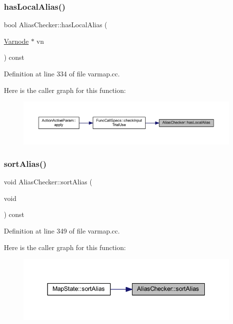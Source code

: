\subsubsection{\texorpdfstring{hasLocalAlias()}{hasLocalAlias()}}
{\footnotesize\ttfamily bool Alias\+Checker\+::has\+Local\+Alias (\begin{DoxyParamCaption}\item[{\mbox{\hyperlink{class_varnode}{Varnode}} $\ast$}]{vn }\end{DoxyParamCaption}) const}



Definition at line 334 of file varmap.\+cc.

Here is the caller graph for this function\+:
\nopagebreak
\begin{figure}[H]
\begin{center}
\leavevmode
\includegraphics[width=350pt]{class_alias_checker_a2bcaccaa3b0553741c68abf06115e113_icgraph}
\end{center}
\end{figure}
\mbox{\label{class_alias_checker_ad37b8720b4894d92a2c3904576aa8b70}} 
\subsubsection{\texorpdfstring{sortAlias()}{sortAlias()}}
{\footnotesize\ttfamily void Alias\+Checker\+::sort\+Alias (\begin{DoxyParamCaption}\item[{void}]{ }\end{DoxyParamCaption}) const}



Definition at line 349 of file varmap.\+cc.

Here is the caller graph for this function\+:
\nopagebreak
\begin{figure}[H]
\begin{center}
\leavevmode
\includegraphics[width=338pt]{class_alias_checker_ad37b8720b4894d92a2c3904576aa8b70_icgraph}
\end{center}
\end{figure}


